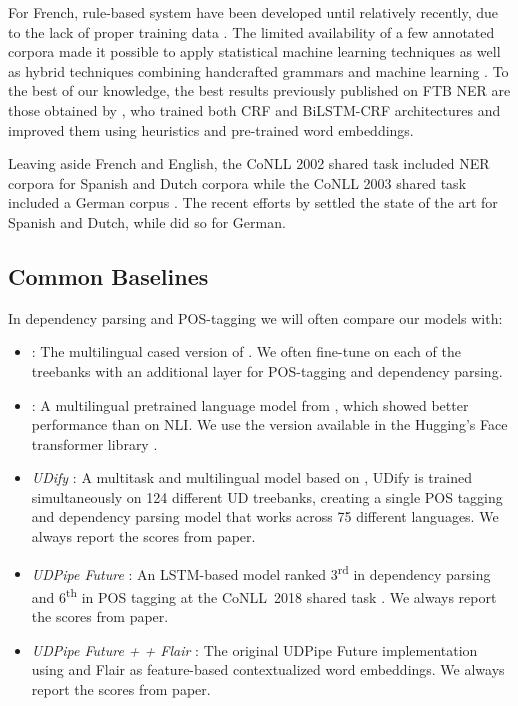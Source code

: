 For French, rule-based system have been developed until relatively recently, due to the lack of proper training data \citep{sekine-nobata-2004-definition,rosset-etal-2005-interaction,stern-sagot-2010-resources,nouvel-etal-2014-pattern}. The limited availability of a few annotated corpora made it possible to apply statistical machine learning techniques \citep{bechet-charton-2010-unsupervised,dupont-tellier-2014-named,dupont-2017-exploration} as well as hybrid techniques combining handcrafted grammars and machine learning \citep{bechet-etal-2011-cooperation}. To the best of our knowledge, the best results previously published on FTB NER are those obtained by \citet{dupont-2017-exploration}, who trained both CRF and BiLSTM-CRF architectures and improved them using heuristics and pre-trained word embeddings.

Leaving aside French and English, the CoNLL 2002 shared task included NER corpora for Spanish and Dutch corpora \citep{tjong-kim-sang-2002-introduction} while the CoNLL 2003 shared task included a German corpus \citep{tjong-kim-sang-de-meulder-2003-introduction}. The recent efforts by \citet{strakova-etal-2019-neural} settled the state of the art for Spanish and Dutch, while \citet{akbik-etal-2018-contextual} did so for German.

\subsection{Common Baselines}
In dependency parsing and POS-tagging we will often compare our models with:

\begin{itemize}
    \item \emph{\mbert}: The multilingual cased version of \bert. We often fine-tune \mbert on each of the treebanks with an additional layer for POS-tagging and dependency parsing.
    \item \emph{\xlmmlmtlm}: A multilingual pretrained language model from \citet{conneau-lample-2019-cross}, which showed better performance than \mbert on NLI. We use the version available in the Hugging's Face transformer library \citep{wolf-etal-2019-huggingface}.
    \item \emph{UDify} \citep{kondratyuk-straka-2019-75}: A multitask and multilingual model based on \mbert, UDify is trained simultaneously on 124 different UD treebanks, creating a single POS tagging and dependency parsing model that works across 75 different languages. We always report the scores from \citet{kondratyuk-straka-2019-75} paper.
    \item \emph{UDPipe Future} \citep{straka-2018-udpipe}: An LSTM-based model ranked 3\textsuperscript{rd} in dependency parsing and 6\textsuperscript{th} in POS tagging at the CoNLL~2018 shared task \citep{seker-etal-2018-universal}. We always report the scores from \citet{kondratyuk-straka-2019-75} paper.
    \item \emph{UDPipe Future + \mbert + Flair} \citep{straka-strakova-2019-evaluating}: The original UDPipe Future implementation using \mbert and Flair as feature-based contextualized word embeddings. We always report the scores from \citet{straka-strakova-2019-evaluating} paper.
\end{itemize}


